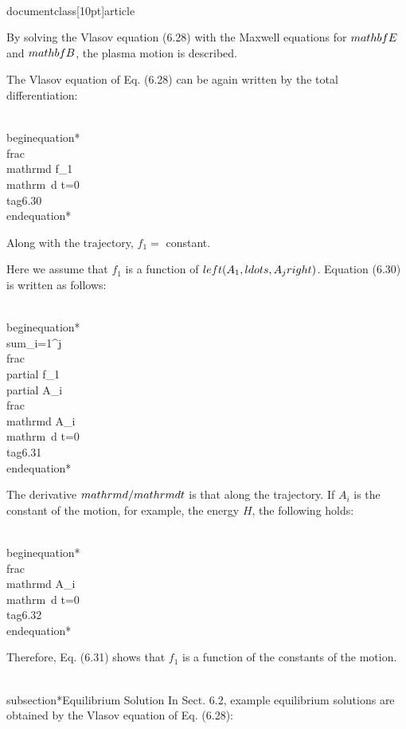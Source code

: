 \\documentclass[10pt]{article}
\begin{document}
{{{{By solving the Vlasov equation (6.28) with the Maxwell equations for $\\mathbf{E}$ and $\\mathbf{B}$, the plasma motion is described.

The Vlasov equation of Eq. (6.28) can be again written by the total differentiation:


\\begin{equation*}
\\frac{\\mathrm{d} f_{1}}{\\mathrm{~d} t}=0 \\tag{6.30}
\\end{equation*}


Along with the trajectory, $f_{1}=$ constant.

Here we assume that $f_{1}$ is a function of $\\left(A_{1}, \\ldots, A_{j}\\right)$. Equation (6.30) is written as follows:


\\begin{equation*}
\\sum_{i=1}^{j} \\frac{\\partial f_{1}}{\\partial A_{i}} \\frac{\\mathrm{d} A_{i}}{\\mathrm{~d} t}=0 \\tag{6.31}
\\end{equation*}


The derivative $\\mathrm{d} / \\mathrm{d} t$ is that along the trajectory. If $A_{i}$ is the constant of the motion, for example, the energy $H$, the following holds:


\\begin{equation*}
\\frac{\\mathrm{d} A_{i}}{\\mathrm{~d} t}=0 \\tag{6.32}
\\end{equation*}


Therefore, Eq. (6.31) shows that $f_{1}$ is a function of the constants of the motion.

\\subsection*{Equilibrium Solution}
In Sect. 6.2, example equilibrium solutions are obtained by the Vlasov equation of Eq. (6.28):


}}}}
\end{document}
